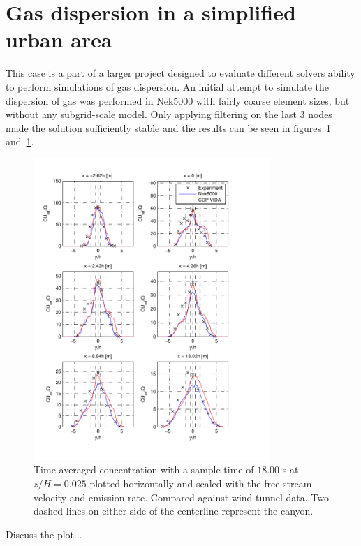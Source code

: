 \section{Gas dispersion in a simplified urban area} 
This case is a part of a larger project designed to evaluate different solvers 
ability to perform simulations of gas dispersion. An initial attempt to simulate the 
dispersion of gas was performed in Nek5000 with fairly coarse element sizes, but without
any subgrid-scale model. Only applying filtering on the last 3 nodes made the solution 
sufficiently stable and the results can be seen in figures~\ref{fig:cHfilter} and~\ref{fig:cHfilter}.
%
\begin{figure}[h]
	\centering
	\includegraphics[width=0.8\textwidth]{Figures/NekcH.pdf}
	\caption{Time-averaged concentration with a sample time of $18.00$ s at $z/H = 0.025$ plotted horizontally and scaled 
	with the free-stream velocity and emission rate. Compared against wind tunnel data.
Two dashed lines on either side of the centerline represent the canyon.}
	\label{fig:cHfilter}
\end{figure}
%
Discuss the plot... 



